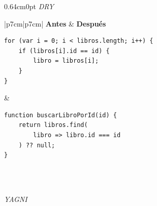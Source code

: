 \documentclass[12pt,letterpaper]{article}
\begin{document}
\begin{adjustwidth}{0.64cm}{0pt}
\vspace{6pt}
\textit{DRY}
\vspace{2pt}

\begin{table}[H]
\centering
\small
\renewcommand{\arraystretch}{1.4}
\caption{DRY: código Antes y Después}
\begin{tabular}{|p{7cm}|p{7cm}|}
\hline
\textbf{Antes} & \textbf{Después} \\
\hline
\begin{minipage}[t]{\linewidth}
\vspace{2pt}
\begin{lstlisting}
for (var i = 0; i < libros.length; i++) {
    if (libros[i].id == id) {
        libro = libros[i];
    }
}
\end{lstlisting}
\vspace{2pt}
\end{minipage}
& \begin{minipage}[t]{\linewidth}
\vspace{2pt}
\begin{lstlisting}
function buscarLibroPorId(id) {
    return libros.find(
        libro => libro.id === id
    ) ?? null;
}
\end{lstlisting}
\vspace{2pt}
\end{minipage} \\
\hline
{} \\
\hline
\end{tabular}
\end{table}

\vspace{6pt}
\textit{YAGNI}
\vspace{2pt}


\end{adjustwidth}
\end{document}
